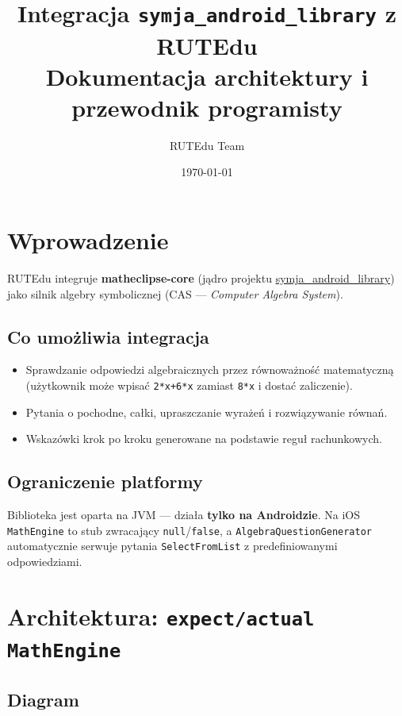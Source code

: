 \documentclass[11pt,a4paper]{article}
\title{\textbf{Integracja \texttt{symja\_android\_library} z RUTEdu}\\
  \large Dokumentacja architektury i przewodnik programisty}
\author{RUTEdu Team}
\date{\today}
\begin{document}
\maketitle
\tableofcontents
\newpage

\section{Wprowadzenie}

RUTEdu integruje \textbf{matheclipse-core} (jądro projektu
\href{https://github.com/axkr/symja_android_library}{symja\_android\_library}) jako silnik
algebry symbolicznej (CAS — \emph{Computer Algebra System}).

\subsection{Co umożliwia integracja}
\begin{itemize}
  \item Sprawdzanie odpowiedzi algebraicznych przez równoważność matematyczną
        (użytkownik może wpisać \texttt{2*x+6*x} zamiast \texttt{8*x} i dostać zaliczenie).
  \item Pytania o pochodne, całki, upraszczanie wyrażeń i rozwiązywanie równań.
  \item Wskazówki krok po kroku generowane na podstawie reguł rachunkowych.
\end{itemize}

\subsection{Ograniczenie platformy}
Biblioteka jest oparta na JVM — działa \textbf{tylko na Androidzie}.
Na iOS \texttt{MathEngine} to stub zwracający \texttt{null}/\texttt{false},
a \texttt{AlgebraQuestionGenerator} automatycznie serwuje pytania \texttt{SelectFromList}
z predefiniowanymi odpowiedziami.

\section{Architektura: \texttt{expect/actual MathEngine}}

\subsection{Diagram}
\end{document}
